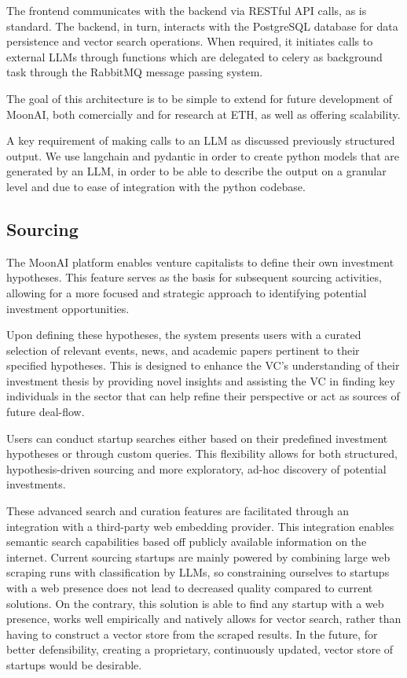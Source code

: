 \documentclass[a4paper, oneside]{discothesis}
\begin{document}
The frontend communicates with the backend via RESTful API calls, as is standard. The backend, in turn, interacts with the PostgreSQL database for data persistence and vector search operations. When required, it initiates calls to external LLMs through functions which  are delegated to celery  as background task through the RabbitMQ message passing system.

The goal of this architecture is to be simple to extend for future development of MoonAI, both comercially and for research at ETH, as well as offering scalability.

A key requirement of making calls to an LLM as discussed previously structured output. We use langchain and pydantic in order to create python models that are generated by an LLM, in order to be able to describe the output on a granular level and due to ease of integration with the python codebase. 

\subsection{Sourcing}
The MoonAI platform enables venture capitalists to define their own investment hypotheses. 
This feature serves as the basis for subsequent sourcing activities, allowing for a more focused and strategic approach to identifying potential investment opportunities.

Upon defining these hypotheses, the system presents users with a curated selection of relevant events, news, and academic papers pertinent to their specified hypotheses. This is designed to enhance the VC's understanding of their investment thesis by providing novel insights and assisting the VC in finding key individuals in the sector that can help refine their perspective or act as sources of future deal-flow.

Users can conduct startup searches either based on their predefined investment hypotheses or through custom queries. This flexibility allows for both structured, hypothesis-driven sourcing and more exploratory, ad-hoc discovery of potential investments.

These advanced search and curation features are facilitated through an integration with a third-party web embedding provider. This integration enables semantic search capabilities based off publicly available information on the internet. Current sourcing startups are mainly powered by combining large web scraping runs with classification by LLMs, so constraining ourselves to startups with a web presence does not lead to decreased quality compared to current solutions. On the contrary, this solution is able to find any startup with a web presence, works well empirically and natively allows for vector search, rather than having to construct a vector store from the scraped results. In the future, for better defensibility, creating a proprietary, continuously updated, vector store of startups would be desirable. 
\end{document}
